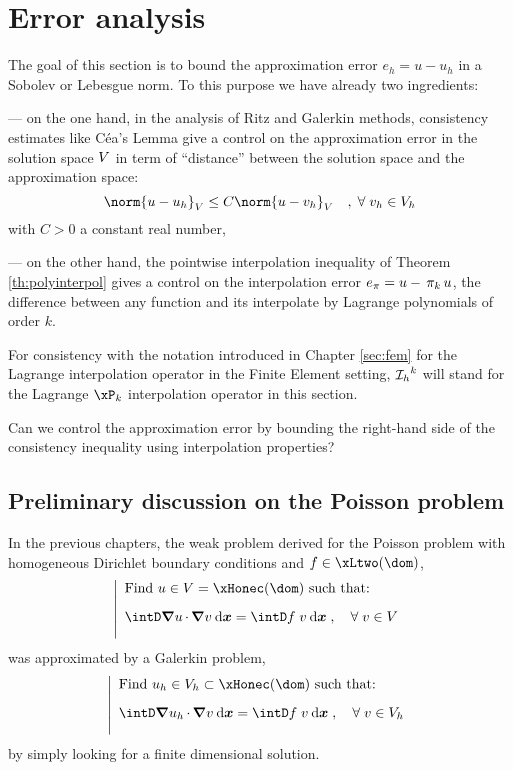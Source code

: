 
\chapter{Error analysis}\label{chap:ea}

The goal of this section is to bound the approximation error $e_h = u - u_h$ in a Sobolev or Lebesgue norm.
To this purpose we have already two ingredients:

--- on the one hand, in the analysis of Ritz and Galerkin methods, consistency estimates like Céa's Lemma give a control on the approximation error in the solution space ${V}$ in term of ``distance'' between the solution space and the approximation space:
\begin{equation*}
\norm{u - u_h}_\xV  \leq C \norm{u - v_h}_\xV\quad,\; \forany v_h \in \xVh
\end{equation*}
with $C > 0$ a constant real number,

--- on the other hand, the pointwise interpolation inequality of Theorem \eqref{th:polyinterpol} gives a control on the interpolation error $e_{\pi} = u - \,\mathrm{\pi}_{k}\, u$, \ie the difference between any function and its interpolate by Lagrange polynomials of order $k$.

\medskip
For consistency with the notation introduced in Chapter \ref{sec:fem} for the Lagrange interpolation operator in the Finite Element setting, $\mathop{\mathcal{I}_{h}}^k$ will stand for the Lagrange $\xP_k$ interpolation operator in this section.

\medskip
\Question Can we control the approximation error by bounding the right-hand side of the consistency inequality using interpolation properties?

\section{Preliminary discussion on the Poisson problem}

In the previous chapters, the weak problem derived for the Poisson problem with homogeneous Dirichlet boundary conditions and $f\in\xLtwo(\dom)$,
\begin{equation*}
\left\lvert
\begin{array}{ll}
\mbox{Find $u\in \xV = \xHonec(\dom)$ such that:}\\[2ex]
\displaystyle\intD \Grad{u}\xDot\Grad{v} \dxx = \intD f\;v \dxx\;,\quad\forany v \in\xV\\[2ex]
\end{array}
\right.
\end{equation*}
was approximated by a Galerkin problem,
\begin{equation*}
\left\lvert
\begin{array}{ll}
\mbox{Find $u_h\in\xVh\subset\xHonec(\dom)$ such that:}\\[2ex]
\displaystyle\intD \Grad{u_h}\xDot\Grad{v} \dxx = \intD f\;v \dxx\;,\quad\forany v \in\xVh\\[2ex]
\end{array}
\right.
\end{equation*}
by simply looking for a finite dimensional solution.

